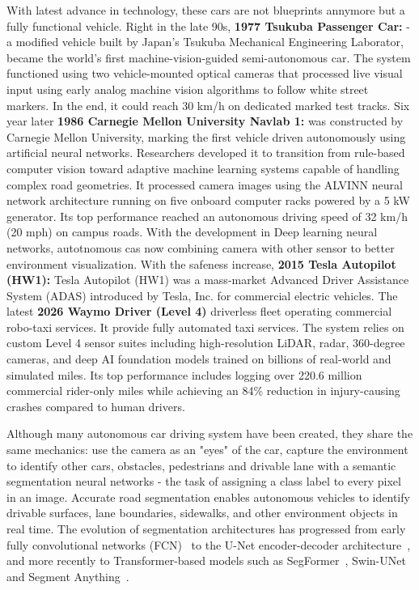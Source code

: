 \documentclass[a4paper]{report}
\begin{document}
With latest advance in technology, these cars are not blueprints annymore but a fully functional vehicle. Right in the late 90s, \textbf{1977 Tsukuba Passenger Car:} - a modified vehicle built by Japan's Tsukuba Mechanical Engineering Laborator, became the world's first machine-vision-guided semi-autonomous car. The system functioned using two vehicle-mounted optical cameras that processed live visual input using early analog machine vision algorithms to follow white street markers. In the end, it could reach  30 km/h on dedicated marked test tracks. Six year later \textbf{1986 Carnegie Mellon University Navlab 1:} was constructed by Carnegie Mellon University, marking the first vehicle driven autonomously using artificial neural networks. Researchers developed it to transition from rule-based computer vision toward adaptive machine learning systems capable of handling complex road geometries. It processed camera images using the ALVINN neural network architecture running on five onboard computer racks powered by a 5 kW generator. Its top performance reached an autonomous driving speed of 32 km/h (20 mph) on campus roads. With the development in Deep learning neural networks, autotnomous cas now combining camera with other sensor to better environment visualization. With the safeness increase, \textbf{2015 Tesla Autopilot (HW1):} Tesla Autopilot (HW1) was a mass-market Advanced Driver Assistance System (ADAS) introduced by Tesla, Inc. for commercial electric vehicles. The latest \textbf{2026 Waymo Driver (Level 4)} driverless fleet operating commercial robo-taxi services. It provide fully automated taxi services. The system relies on custom Level 4 sensor suites including high-resolution LiDAR, radar, 360-degree cameras, and deep AI foundation models trained on billions of real-world and simulated miles. Its top performance includes logging over 220.6 million commercial rider-only miles while achieving an 84\% reduction in injury-causing crashes compared to human drivers.

Although many autonomous car driving system have been created, they share the same mechanics: use the camera as an "eyes" of the car, capture the environment to identify other cars, obstacles, pedestrians and drivable lane with a semantic segmentation neural networks - the task of assigning a class label to every pixel in an image. Accurate road segmentation enables autonomous vehicles to identify drivable surfaces, lane boundaries, sidewalks, and other environment objects in real time. The evolution of segmentation architectures has progressed from early fully convolutional networks (FCN)~\cite{long2015fcn} to the U-Net encoder-decoder architecture~\cite{ronneberger2015unet}, and more recently to Transformer-based models such as SegFormer~\cite{xie2021segformer}, Swin-UNet~\cite{cao2022swinunet} and Segment Anything~\cite{kirillov2023segment}.
\end{document}
